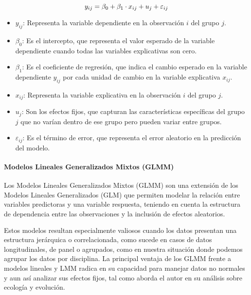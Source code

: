 \documentclass[
  11pt,
  bookmarksnumbered]{article}
\begin{document}
\begin{equation}
\large y_{ij} = \beta_0 + \beta_1 \cdot x_{ij} + u_{j} + \varepsilon_{ij}\end{equation}

\begin{itemize}
\item
  \(y_{ij}\): Representa la variable dependiente en la observación \(i\) del grupo \(j\).
\item
  \(\beta_0\): Es el intercepto, que representa el valor esperado de la variable dependiente cuando todas las variables explicativas son cero.
\item
  \(\beta_1\): Es el coeficiente de regresión, que indica el cambio esperado en la variable dependiente \(y_{ij}\) por cada unidad de cambio en la variable explicativa \(x_{ij}\).
\item
  \(x_{ij}\): Representa la variable explicativa en la observación \(i\) del grupo \(j\).
\item
  \(u_j\): Son los efectos fijos, que capturan las características específicas del grupo \(j\) que no varían dentro de ese grupo pero pueden variar entre grupos.
\item
  \(\varepsilon_{ij}\): Es el término de error, que representa el error aleatorio en la predicción del modelo.
\end{itemize}

\hypertarget{modelos-lineales-generalizados-mixtos-glmm}{%
\paragraph{Modelos Lineales Generalizados Mixtos (GLMM)}\label{modelos-lineales-generalizados-mixtos-glmm}}

Los Modelos Lineales Generalizados Mixtos (GLMM) son una extensión de los Modelos Lineales Generalizados (GLM) que permiten modelar la relación entre variables predictoras y una variable respuesta, teniendo en cuenta la estructura de dependencia entre las observaciones y la inclusión de efectos aleatorios.

Estos modelos resultan especialmente valiosos cuando los datos presentan una estructura jerárquica o correlacionada, como sucede en casos de datos longitudinales, de panel o agrupados, como en nuestra situación donde podemos agrupar los datos por disciplina.
La principal ventaja de los GLMM frente a modelos lineales y LMM radica en su capacidad para manejar datos no normales y aun así analizar sus efectos fijos, tal como aborda el autor \textcite{bolker2009generalized} en su análisis sobre ecología y evolución.
\end{document}
